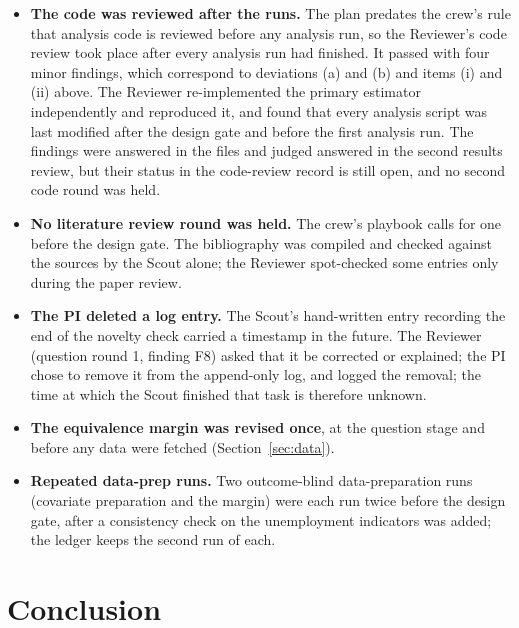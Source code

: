 \documentclass[11pt]{article}
\begin{document}
\begin{itemize}
retroactive. The ruling for the range count was logged before that count ran.
\item \textbf{The code was reviewed after the runs.} The plan predates the crew's rule that
analysis code is reviewed before any analysis run, so the Reviewer's code review took place
after every analysis run had finished. It passed with four minor findings, which correspond to
deviations (a) and (b) and items (i) and (ii) above. The Reviewer re-implemented the primary
estimator independently and reproduced it, and found that every analysis script was last
modified after the design gate and before the first analysis run. The findings were answered
in the files and judged answered in the second results review, but their status in the
code-review record is still open, and no second code round was held.
\item \textbf{No literature review round was held.} The crew's playbook calls for one before
the design gate. The bibliography was compiled and checked against the sources by the Scout
alone; the Reviewer spot-checked some entries only during the paper review.
\item \textbf{The PI deleted a log entry.} The Scout's hand-written entry recording the end of
the novelty check carried a timestamp in the future. The Reviewer (question round 1, finding
F8) asked that it be corrected or explained; the PI chose to remove it from the append-only
log, and logged the removal; the
time at which the Scout finished that task is therefore unknown.
\item \textbf{The equivalence margin was revised once}, at the question stage and before any
data were fetched (Section~\ref{sec:data}).
\item \textbf{Repeated data-prep runs.} Two outcome-blind data-preparation runs (covariate
preparation and the margin) were each run twice before the design gate, after a consistency
check on the unemployment indicators was added; the ledger keeps the second run of each.
\end{itemize}

\section{Conclusion}
\end{document}
